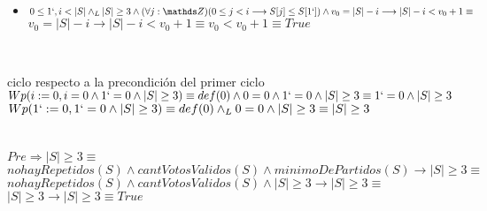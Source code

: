 \documentclass[10pt,a4paper]{article}
\begin{document}
\begin{enumerate}
\begin{itemize}
        \item $0 \leq 1`,i<|S|  \land_L |S| \geq 3 \land (\forall j: \ent)(0\leq j < i \longrightarrow S[j]\leq S[1`]) \land v_0 =|S|-i \longrightarrow |S|-i<v_0+1 \equiv $\\

        $v_0 =|S|-i \longrightarrow |S|-i<v_0+1 \equiv v_0<v_0+1 \equiv True$\\
       
    \end{itemize}

    \\

    
   
    {ciclo respecto a la precondici\'on del primer ciclo} \\

    $Wp(i:=0, i=0 \land 1`=0 \land |S|\geq 3) \equiv def(0) \land 0=0 \land 1`=0 \land |S|\geq 3 \equiv 1`=0 \land |S|\geq3$\\

    $Wp(1`:=0, 1`=0 \land |S|\geq3) \equiv def(0) \land_L 0=0 \land |S|\geq 3 \equiv |S|\geq 3$\\

     \\

    \\

    $Pre \Longrightarrow |S|\geq 3 \equiv$\\

    $nohayRepetidos(S) \land cantVotosValidos(S) \land minimoDePartidos(S) \longrightarrow |S|\geq 3 \equiv$\\

    $nohayRepetidos(S) \land cantVotosValidos(S) \land |S|\geq 3\longrightarrow |S|\geq 3 \equiv$\\

    $|S|\geq 3 \longrightarrow |S|\geq 3 \equiv True$\\

\end{enumerate} 
\end{document}
